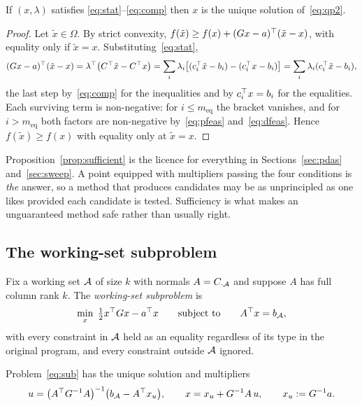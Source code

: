 \begin{proposition}[Sufficiency]\label{prop:sufficient}
If $(x,\lambda)$ satisfies \eqref{eq:stat}--\eqref{eq:comp} then $x$ is the
unique solution of~\eqref{eq:qp2}.
\end{proposition}

\begin{proof}
Let $\tilde x \in \Omega$. By strict convexity,
$f(\tilde x) \ge f(x) + (G x - a)^{\top}(\tilde x - x)$, with equality only if
$\tilde x = x$. Substituting~\eqref{eq:stat},
\[
  (G x - a)^{\top}(\tilde x - x)
  = \lambda^{\top}\bigl(C^{\top} \tilde x - C^{\top} x\bigr)
  = \sum_i \lambda_i\bigl[(c_i^{\top}\tilde x - b_i) - (c_i^{\top} x - b_i)\bigr]
  = \sum_i \lambda_i (c_i^{\top} \tilde x - b_i),
\]
the last step by~\eqref{eq:comp} for the inequalities and by $c_i^{\top} x = b_i$ for
the equalities. Each surviving term is non-negative: for $i \le m_{\mathrm{eq}}$
the bracket vanishes, and for $i > m_{\mathrm{eq}}$ both factors are
non-negative by~\eqref{eq:pfeas} and~\eqref{eq:dfeas}. Hence
$f(\tilde x) \ge f(x)$ with equality only at $\tilde x = x$.
\end{proof}

Proposition~\ref{prop:sufficient} is the licence for everything in
Sections~\ref{sec:pdas} and~\ref{sec:sweep}. A point equipped with multipliers
passing the four conditions is \emph{the} answer, so a method that produces
candidates may be as unprincipled as one likes provided each candidate is
tested. Sufficiency is what makes an unguaranteed method safe rather than
usually right.

\subsection{The working-set subproblem}

Fix a working set $\mathcal{A}$ of size $k$ with normals $A = C_{\cdot\mathcal{A}}$ and
suppose $A$ has full column rank $k$. The \emph{working-set subproblem} is
\begin{equation}
  \min_{x} \; \tfrac12 x^{\top} G x - a^{\top} x
  \qquad \text{subject to} \qquad A^{\top} x = b_{\mathcal{A}},
  \label{eq:sub}
\end{equation}
with every constraint in $\mathcal{A}$ held as an equality regardless of its type in
the original program, and every constraint outside $\mathcal{A}$ ignored.

\begin{proposition}\label{prop:sub}
Problem~\eqref{eq:sub} has the unique solution and multipliers
\begin{equation}
  u = \bigl(A^{\top} G^{-1} A\bigr)^{-1}\bigl(b_{\mathcal{A}} - A^{\top} x_u\bigr),
  \qquad
  x = x_u + G^{-1} A\, u,
  \qquad x_u := G^{-1} a .
  \label{eq:subsol}
\end{equation}
\end{proposition}

